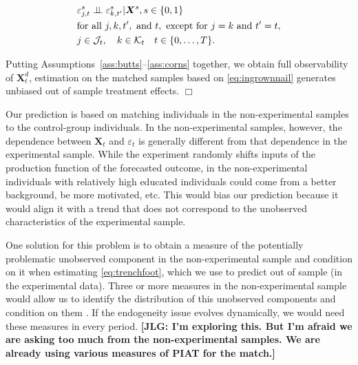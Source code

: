 \renewcommand\theassumption{A--\arabic{assumption}}
\begin{assumption}\label{ass:corns}
\begin{align*}
&\varepsilon^s_{j,t} \perp\!\!\!\perp \varepsilon^s_{k,t^\prime} | \bm{X}^s, s \in \{0,1\}\\
&\text{for all } j, k, t^\prime, \text{ and } t, \text{ except for } j=k \text{ and } t^\prime = t,\\
&j \in \mathcal{J}_t, \quad k \in \mathcal{K}_t \quad t \in \{0,\dots,T\}.
\end{align*}
\end{assumption}

\begin{theorem}
Putting Assumptions~\ref{ass:butts}--\ref{ass:corns} together, we obtain full observability of $\bm{X}^d_t$, estimation on the matched samples based on \eqref{eq:ingrownnail} generates unbiased out of sample treatment effects. $\Box$
\end{theorem}

Our prediction is based on matching individuals in the non-experimental samples to the control-group individuals. In the non-experimental samples, however, the dependence between $\mathbf{X}_{t}$ and $\varepsilon_{t}$ is generally different from that dependence in the experimental sample. While the experiment randomly shifts inputs of the production function of the forecasted outcome, in the non-experimental individuals with relatively high educated individuals could come from a better background, be more motivated, etc. This would bias our prediction because it would align it with a trend that does not correspond to the unobserved characteristics of the experimental sample. 

One solution for this problem is to obtain a measure of the potentially problematic unobserved component in the non-experimental sample and condition on it when estimating \eqref{eq:trenchfoot}, which we use to predict out of sample (in the experimental data). Three or more measures in the non-experimental sample would allow us to identify the distribution of this unobserved components and condition on them \citet{Cunha_Heckman_ea_2005_oep,Cunha_Heckman_etal_2010_est_tech_cognoncog}. If the endogeneity issue evolves dynamically, we would need these measures in every period. \textbf{[JLG: I'm exploring this. But I'm afraid we are asking too much from the non-experimental samples. We are already using various measures of PIAT for the match.]}


